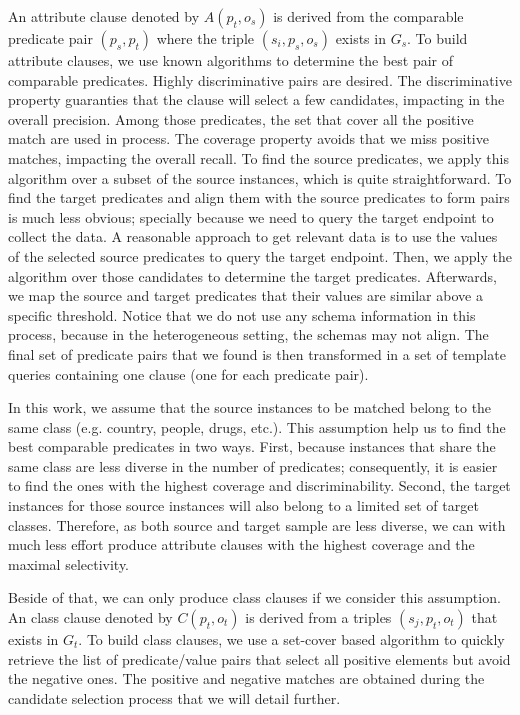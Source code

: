 An attribute clause denoted by $A(p_t,o_s)$ is derived from the comparable predicate pair $(p_s, p_t)$ where the triple $(s_i, p_s, o_s)$ exists in $G_s$. To build attribute clauses, we use known algorithms to determine the best pair of comparable predicates. Highly discriminative pairs are desired. The discriminative property guaranties that the clause will select a few candidates, impacting in the overall precision. Among those predicates, the set that cover all the positive match are used in process. The coverage property avoids that we miss positive matches, impacting the overall recall. To find the source predicates, we apply this algorithm over a subset of the source instances, which is quite straightforward. To find the target predicates and align them with the source predicates to form pairs is much less obvious; specially because we need to query the target endpoint to collect the data. A reasonable approach to get relevant data is to use the values of the selected source predicates to query the target endpoint. Then, we apply the algorithm over those candidates to determine the target predicates. Afterwards, we map the source and target predicates that their values are similar above a specific threshold. Notice that we do not use any schema information in this process, because in the heterogeneous setting, the schemas may not align. The final set of predicate pairs that we found is then transformed in a set of template queries containing one clause (one for each predicate pair).

In this work, we assume that the source instances to be matched belong to the same class (e.g. country, people, drugs, etc.). This assumption help us to find the best comparable predicates in two ways. First, because instances that share the same class are less diverse in the number of predicates; consequently, it is easier to find the ones with the highest coverage and discriminability. Second, the target instances for those source instances will also belong to a limited set of target classes. Therefore, as both source and target sample are less diverse, we can with much less effort produce attribute clauses with the highest coverage and the maximal selectivity.

Beside of that, we can only produce class clauses if we consider this assumption. An class clause denoted by $C(p_t,o_t)$ is derived from a triples $(s_j, p_t, o_t)$ that exists in $G_t$. To build class clauses, we use a set-cover based algorithm \cite{DBLP:conf/soda/CarrDKM00} to quickly retrieve the list of predicate/value pairs that select all positive elements but avoid the negative ones. The positive and negative matches are obtained during the candidate selection process that we will detail further.

